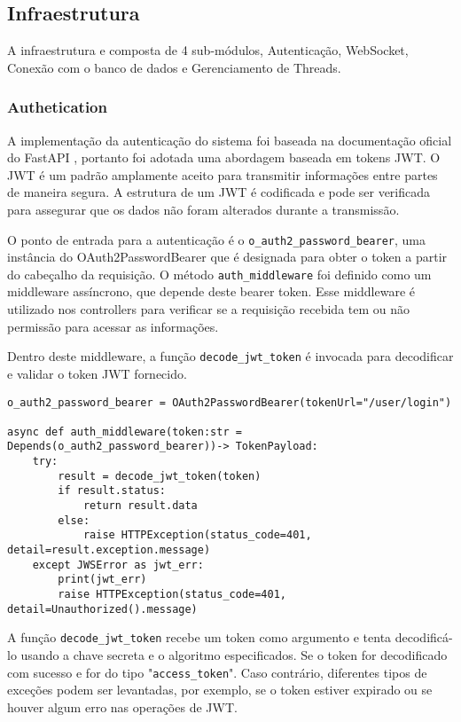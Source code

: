 \subsection{Infraestrutura}\label{subsec:infra}

A infraestrutura e composta de 4 sub-módulos, Autenticação, WebSocket, Conexão com o banco de dados e Gerenciamento de Threads.

\subsubsection{Authetication}\label{subsubsec:auth}
A implementação da autenticação do sistema foi baseada na documentação oficial do FastAPI \cite{fastapiSecurity}, portanto foi adotada uma abordagem baseada em tokens \gls{JWT}. O \gls{JWT} é um padrão amplamente aceito para transmitir informações entre partes de maneira segura. A estrutura de um \gls{JWT} é codificada e pode ser verificada para assegurar que os dados não foram alterados durante a transmissão. 

O ponto de entrada para a autenticação é o \texttt{o\_auth2\_password\_bearer}, uma instância do OAuth2PasswordBearer que é designada para obter o token a partir do cabeçalho da requisição. O método \texttt{auth\_middleware} foi definido como um middleware assíncrono, que depende deste bearer token. Esse middleware é utilizado nos controllers para verificar se a requisição recebida tem ou não permissão para acessar as informações.


Dentro deste middleware, a função \texttt{decode\_jwt\_token} é invocada para decodificar e validar o token \gls{JWT} fornecido.

\begin{verbatim}
o_auth2_password_bearer = OAuth2PasswordBearer(tokenUrl="/user/login")

async def auth_middleware(token:str = Depends(o_auth2_password_bearer))-> TokenPayload:
    try:
        result = decode_jwt_token(token)
        if result.status:
            return result.data
        else:
            raise HTTPException(status_code=401, detail=result.exception.message)
    except JWSError as jwt_err:
        print(jwt_err)
        raise HTTPException(status_code=401, detail=Unauthorized().message)
\end{verbatim}

A função \texttt{decode\_jwt\_token} recebe um token como argumento e tenta decodificá-lo usando a chave secreta e o algoritmo especificados. Se o token for decodificado com sucesso e for do tipo "\texttt{access\_token}". Caso contrário, diferentes tipos de exceções podem ser levantadas, por exemplo, se o token estiver expirado ou se houver algum erro nas operações de \gls{JWT}.

